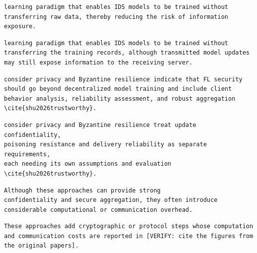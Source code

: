 \documentclass[10pt,a4paper]{article}
\begin{document}
\begin{before}[lines 149--151]
\begin{Verbatim}
learning paradigm that enables IDS models to be trained without
transferring raw data, thereby reducing the risk of information
exposure.
\end{Verbatim}
\end{before}
\begin{after}
\begin{Verbatim}
learning paradigm that enables IDS models to be trained without
transferring the training records, although transmitted model updates
may still expose information to the receiving server.
\end{Verbatim}
\end{after}

\begin{before}[lines 171--175]
\begin{Verbatim}
consider privacy and Byzantine resilience indicate that FL security
should go beyond decentralized model training and include client
behavior analysis, reliability assessment, and robust aggregation
\cite{shu2026trustworthy}.
\end{Verbatim}
\end{before}
\begin{after}
\begin{Verbatim}
consider privacy and Byzantine resilience treat update confidentiality,
poisoning resistance and delivery reliability as separate requirements,
each needing its own assumptions and evaluation
\cite{shu2026trustworthy}.
\end{Verbatim}
\end{after}

\begin{before}[lines 201--203]
\begin{Verbatim}
Although these approaches can provide strong
confidentiality and secure aggregation, they often introduce
considerable computational or communication overhead.
\end{Verbatim}
\end{before}
\begin{after}
\begin{Verbatim}
These approaches add cryptographic or protocol steps whose computation
and communication costs are reported in [VERIFY: cite the figures from
the original papers].
\end{Verbatim}
\end{after}
\end{document}
